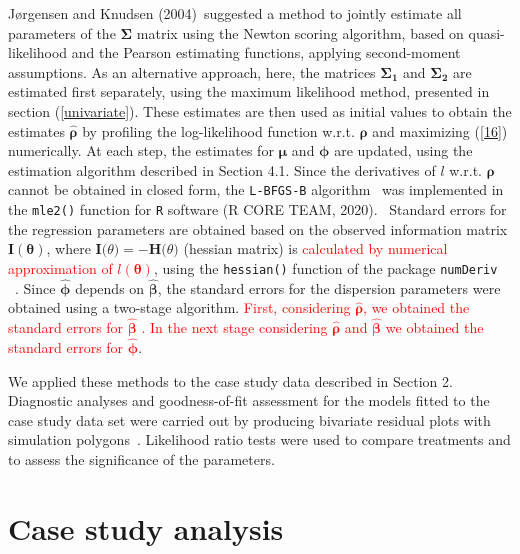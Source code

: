 \documentclass[useAMS,referee]{biom}
\begin{document}
J{\o}rgensen and Knudsen (2004)~\nocite{jorgensen2004parameter}suggested a method to jointly estimate all parameters of the $\boldsymbol{\Sigma}$ matrix using the Newton scoring algorithm, based on quasi-likelihood and the Pearson estimating functions, applying second-moment assumptions. As an alternative approach, here, the matrices $\boldsymbol{\Sigma_1}$ and $\boldsymbol{\Sigma_2}$ are estimated first separately, using the maximum likelihood method, presented in section (\ref{univariate}). These estimates are then used as initial values to obtain the estimates $\boldsymbol{\hat\rho}$ by profiling the log-likelihood function w.r.t. $\boldsymbol{\rho}$ and maximizing (\ref{16}) numerically. At each step, the estimates for $\boldsymbol{\mu}$ and $\boldsymbol{\phi}$ are updated, using the estimation algorithm described in Section 4.1. Since the derivatives of $l$ w.r.t. $\boldsymbol{\rho}$ cannot be obtained in closed form, the  \texttt{L-BFGS-B} algorithm~\citep{zhu1997algorithm} was implemented in the \texttt{mle2()} function for \texttt{R} software (R CORE TEAM, 2020).~\nocite{team2020r} Standard errors for the regression parameters are obtained based on the observed information matrix $\mathbf{I}(\boldsymbol\theta)$, where $\textbf{I}\boldsymbol(\theta)= - \textbf{H}\boldsymbol(\theta)$ (hessian matrix) is \textcolor{red}{calculated by numerical approximation of $l(\boldsymbol\theta)$}, using the \texttt{hessian()} function of the package  \texttt{numDeriv} ~\citep{gilbert2006numderiv}. Since $\hat{\boldsymbol{\phi}}$ depends on $\hat{\boldsymbol{\beta}}$, the standard errors for the dispersion parameters were obtained using a two-stage algorithm. \textcolor{red}{First, considering $\boldsymbol{\hat\rho}$, we obtained the  standard errors for $\boldsymbol{\hat\beta}$ . In the next stage considering $\boldsymbol{\hat\rho}$ and $\boldsymbol{\hat\beta}$ we obtained the standard errors for $\boldsymbol{\hat\phi}$}.

We applied these methods to the case study data described in Section 2. Diagnostic analyses and goodness-of-fit assessment for the models fitted to the case study data set were carried out by producing bivariate residual plots with simulation polygons~\citep{moral2020bivariate}. Likelihood ratio tests were used to compare treatments and to assess the significance of the parameters.



\section{Case study analysis}
\end{document}
